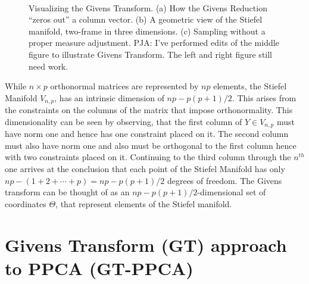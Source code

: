 \documentclass{article}
\newcommand{\commentPJA}[1]{{\textcolor{commentPJA_color}{PJA: #1}}}
\begin{document}
\begin{figure}
\begin{subfigure}[b]{0.3\textwidth}
        \caption{}
        \label{fig:GivensReductionm}
    \end{subfigure}
    ~ %
    \begin{subfigure}[b]{0.3\textwidth}
        \caption{}
        \label{fig:AreaForm}
    \end{subfigure}
    \caption{Visualizing the Givens Transform. (a) How the Givens Reduction ``zeros out'' a column vector. (b) A geometric view of the Stiefel manifold, two-frame in three dimensions. (c) Sampling without a proper measure adjustment. \commentPJA{I've performed edits of the middle figure to illustrate Givens Transform.  The left and right figure still need work.}}\label{fig:Givens}
\end{figure}
 
While $n \times p$ orthonormal matrices are represented by $np$ elements, the Stiefel Manifold $V_{n,p}$, has an intrinsic dimension of $np-p(p+1)/2$. This arises from the constraints on the columns of the matrix that impose orthonormality.  This dimensionality can be seen by observing, that the first column of $Y \in V_{n,p}$ must have norm one and hence has one constraint placed on it. The second column must also have norm one and also must be orthogonal to the first column hence with two constraints placed on it.  Continuing to the third column through the $n^{th}$ one arrives at the conclusion that each point of the Stiefel Manifold has only $np - (1+2+\cdots+p) =np-p(p+1)/2$ degrees of freedom.  The Givens transform can be thought of as an $np-p(p+1)/2$-dimensional set of coordinates $\Theta$, that represent elements of the Stiefel manifold.

\section{Givens Transform (GT) approach to PPCA (GT-PPCA)} \label{Givens}
\end{document}

